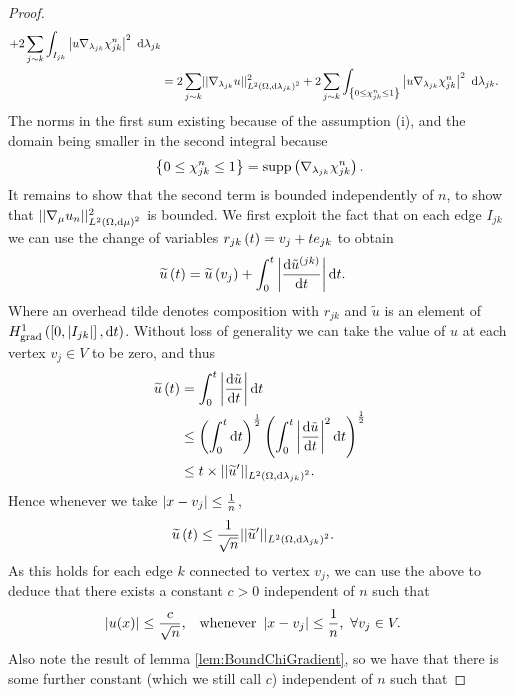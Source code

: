 \begin{proof}
\begin{align*}
		+ 2\sum_{j\sim k}\int_{I_{jk}}\left\lvert u\nabla_{\lambda_{jk}}\chi_{jk}^n \right\rvert^2 \ \mathrm{d}\lambda_{jk} \\
		&= 2\sum_{j\sim k}\lvert\lvert \nabla_{\lambda_{jk}}u \rvert\rvert_{L^{2}\left( \Omega,\mathrm{d}\lambda_{jk} \right)^2}^2
		+ 2\sum_{j\sim k}\int_{\left\{ 0\leq\chi_{jk}^n\leq 1 \right\}}\left\lvert u\nabla_{\lambda_{jk}}\chi_{jk}^n \right\rvert^2 \ \mathrm{d}\lambda_{jk}.
	\end{align*}
	The norms in the first sum existing because of the assumption (i), and the domain being smaller in the second integral because 
	\begin{align*}
		\left\{ 0\leq\chi_{jk}^n\leq 1 \right\} = \mathrm{supp}\left( \nabla_{\lambda_{jk}}\chi_{jk}^n \right).
	\end{align*}
	It remains to show that the second term is bounded independently of $n$, to show that $\lvert\lvert \nabla_{\mu}u_n \rvert\rvert_{L^{2}\left( \Omega,\mathrm{d}\mu \right)^2}^2$ is bounded. 
	We first exploit the fact that on each edge $I_{jk}$ we can use the change of variables $r_{jk}\left( t \right) = v_j + t e_{jk}$ to obtain
	\begin{align*}
		\widetilde{u}\left( t \right) &= \widetilde{u}\left( v_j \right) + \int_0^t \left\lvert \dfrac{\mathrm{d}\tilde{u}^{(jk)}}{\mathrm{d}t} \right\rvert \mathrm{d} t.
	\end{align*}
	Where an overhead tilde denotes composition with $r_{jk}$ and $\widetilde{u}$ is an element of $H^1_\mathrm{grad}\left( \left[ 0,\left\lvert I_{jk} \right\rvert \right], \mathrm{d}t \right)$.	
	Without loss of generality we can take the value of $u$ at each vertex $v_j\in V$ to be zero, and thus
	\begin{align*}
		\widetilde{u}\left( t \right) &= \int_0^t \left\lvert \dfrac{\mathrm{d}\tilde{u}}{\mathrm{d}t} \right\rvert \mathrm{d} t \\
		&\leq \left(  \int_0^t \mathrm{d} t  \right)^{\frac{1}{2}} \left(  \int_0^t \left\lvert \dfrac{\mathrm{d}\tilde{u}}{\mathrm{d}t} \right\rvert^2 \mathrm{d} t  \right)^{\frac{1}{2}} \\
		&\leq t\times \lvert\lvert \widetilde{u}' \rvert\rvert_{L^{2}\left( \Omega,\mathrm{d}\lambda_{jk} \right)^2}.
	\end{align*}
	Hence whenever we take $\left\lvert x-v_j \right\rvert\leq\frac{1}{n}$, 
	\begin{align*}
		\widetilde{u}\left( t \right) &\leq \frac{1}{\sqrt{n}}\lvert\lvert \widetilde{u}' \rvert\rvert_{L^{2}\left( \Omega,\mathrm{d}\lambda_{jk} \right)^2}.
	\end{align*}		
	As this holds for each edge $k$ connected to vertex $v_j$, we can use the above to deduce that there exists a constant $c>0$ independent of $n$ such that
	\begin{align*}
		\left\lvert  u(x)  \right\rvert \leq \frac{c}{\sqrt{n}}, &\quad\text{whenever } \left\lvert x-v_j \right\rvert\leq\frac{1}{n}, \ \forall v_j\in V.
	\end{align*}
	Also note the result of lemma \ref{lem:BoundChiGradient}, so we have that there is some further constant (which we still call $c$) independent of $n$ such that

\end{proof}
